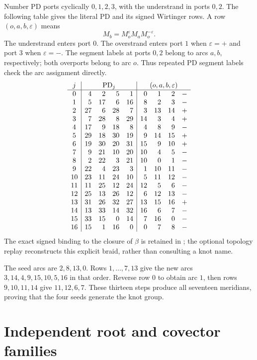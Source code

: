 \documentclass[11pt]{article}
\begin{document}
Number PD ports cyclically $0,1,2,3$, with the understrand in
ports $0,2$. The following table gives the literal PD and its
signed Wirtinger rows. A row $(o,a,b,\varepsilon)$ means
\[
 M_b=M_o^\varepsilon M_aM_o^{-\varepsilon}.
\]
The understrand enters port $0$. The overstrand enters port $1$
when $\varepsilon=+$ and port $3$ when $\varepsilon=-$.
The segment labels at ports $0,2$ belong to arcs $a,b$, respectively;
both overports belong to arc $o$. Thus repeated PD segment labels
check the arc assignment directly.
\[
\begin{array}{c|rrrr|rrrr}
j&\multicolumn{4}{c|}{\mathrm{PD}_j}
 &\multicolumn{4}{c}{(o,a,b,\varepsilon)}\\\hline
0&4&2&5&1&0&1&2&-\\
1&5&17&6&16&8&2&3&-\\
2&27&6&28&7&3&13&14&+\\
3&7&28&8&29&14&3&4&+\\
4&17&9&18&8&4&8&9&-\\
5&29&18&30&19&9&14&15&+\\
6&19&30&20&31&15&9&10&+\\
7&9&21&10&20&10&4&5&-\\
8&2&22&3&21&10&0&1&-\\
9&22&4&23&3&1&10&11&-\\
10&23&11&24&10&5&11&12&-\\
11&11&25&12&24&12&5&6&-\\
12&25&13&26&12&6&12&13&-\\
13&31&26&32&27&13&15&16&+\\
14&13&33&14&32&16&6&7&-\\
15&33&15&0&14&7&16&0&-\\
16&15&1&16&0&0&7&8&-
\end{array}
\]
The exact signed binding to the closure of $\beta$ is retained in
; the optional topology replay
reconstructs this explicit braid, rather than consulting a knot name.

The seed arcs are $2,8,13,0$. Rows $1,\ldots,7,13$ give the new
arcs $3,14,4,9,15,10,5,16$ in that order. Reverse row $0$ to obtain
arc $1$, then rows $9,10,11,14$ give $11,12,6,7$.
These thirteen steps produce all seventeen meridians, proving that
the four seeds generate the knot group.

\section{Independent root and covector families}
\end{document}
